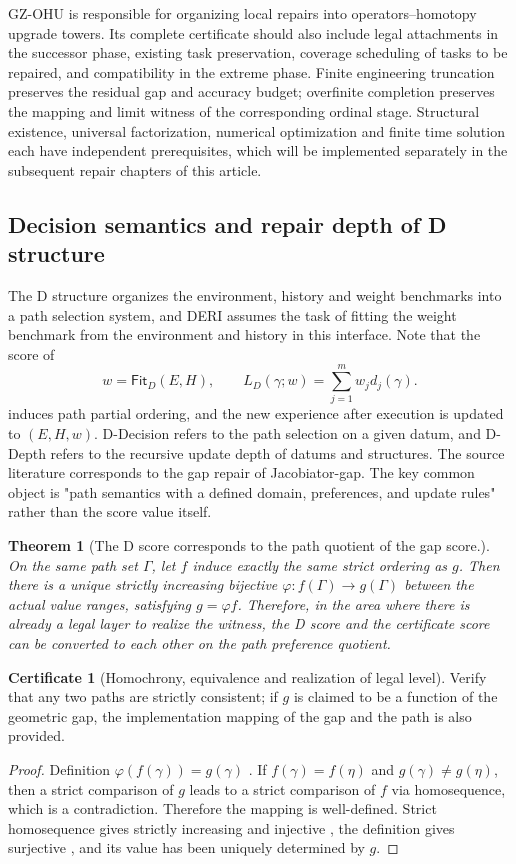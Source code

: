 \documentclass[11pt,a4paper]{article}
\theoremstyle{plain}
\newtheorem{theorem}{Theorem}[section]
\theoremstyle{definition}
\newtheorem*{certificate}{Certificate}
\theoremstyle{remark}
\begin{document}
\begin{CJK*}
GZ-OHU is responsible for organizing local repairs into operators--homotopy upgrade towers. Its complete certificate should also include legal attachments in the successor phase, existing task preservation, coverage scheduling of tasks to be repaired, and compatibility in the extreme phase. Finite engineering truncation preserves the residual gap and accuracy budget; overfinite completion preserves the mapping and limit witness of the corresponding ordinal stage. Structural existence, universal factorization, numerical optimization and finite time solution each have independent prerequisites, which will be implemented separately in the subsequent repair chapters of this article.

\subsection { Decision semantics and repair depth of D structure }

The D structure organizes the environment, history and weight benchmarks into a path selection system, and DERI assumes the task of fitting the weight benchmark from the environment and history in this interface. Note that the score of \[
 w=\mathsf{Fit}_D(E,H),\qquad
 L_D(\gamma;w)=\sum_{j=1}^{m}w_jd_j(\gamma).
\] induces path partial ordering, and the new experience after execution is updated to $(E,H,w)$. D-Decision refers to the path selection on a given datum, and D-Depth refers to the recursive update depth of datums and structures. The source literature corresponds to the gap repair of Jacobiator-gap. The key common object is "path semantics with a defined domain, preferences, and update rules" rather than the score value itself. \cite{S05,S06}

\begin{theorem}
[The D score corresponds to the path quotient of the gap score.]\label{fa:thm-decision}
On the same path set $\Gamma$, let $f$ induce exactly the same strict ordering as $g$. Then there is a unique strictly increasing bijective $\varphi:f(\Gamma)\to g(\Gamma)$ between the actual value ranges, satisfying $g=\varphi f$. Therefore, in the area where there is already a legal layer to realize the witness, the D score and the certificate score can be converted to each other on the path preference quotient.\end{theorem}
\begin{certificate}
[Homochrony, equivalence and realization of legal level]Verify that any two paths are strictly consistent; if $g$ is claimed to be a function of the geometric gap, the implementation mapping of the gap and the path is also provided.\end{certificate}
\begin{proof}
Definition $\varphi(f(\gamma))=g(\gamma)$ . If $f(\gamma)=f(\eta)$ and $g(\gamma)\ne g(\eta)$, then a strict comparison of $g$ leads to a strict comparison of $f$ via homosequence, which is a contradiction. Therefore the mapping is well-defined. Strict homosequence gives strictly increasing and injective , the definition gives surjective , and its value has been uniquely determined by $g$.\end{proof}



\end{CJK*}
\end{document}
